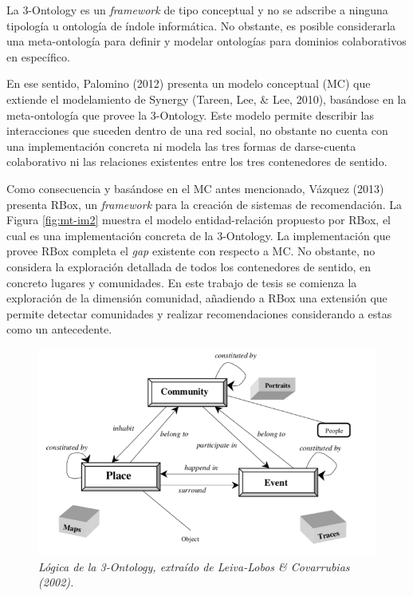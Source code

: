 La 3-Ontology es un \textit{framework} de tipo conceptual y no se adscribe a ninguna tipología u ontología de índole informática. No obstante, es posible considerarla una meta-ontología para definir y modelar ontologías para dominios colaborativos en específico.

En ese sentido, Palomino (2012) presenta un modelo conceptual (MC) que extiende el modelamiento de Synergy (Tareen, Lee, & Lee, 2010), basándose en la meta-ontología que provee la 3-Ontology. Este modelo permite describir las interacciones que suceden dentro de una red social, no obstante no cuenta con una implementación concreta ni modela las tres formas de darse-cuenta colaborativo ni las relaciones existentes entre los tres contenedores de sentido.

Como consecuencia y basándose en el MC antes mencionado, Vázquez (2013) presenta RBox, un \textit{framework} para la creación de sistemas de recomendación.  La Figura \ref{fig:mt-im2} muestra el modelo entidad-relación propuesto por RBox, el cual es una implementación concreta de la 3-Ontology. La implementación que provee RBox completa el \textit{gap} existente con respecto a MC. No obstante, no considera la exploración detallada de todos los contenedores de sentido, en concreto lugares y comunidades. En este trabajo de tesis se comienza la exploración de la dimensión comunidad, añadiendo a RBox una extensión que permite detectar comunidades y realizar recomendaciones considerando a estas como un antecedente.

\begin{figure}
	\centering
	\includegraphics[scale=.5]{images/Figura2-1}
	\caption{\em Lógica de la 3-Ontology, extraído de Leiva-Lobos & Covarrubias (2002).}
	\label{fig:mt-im1}
\end{figure}

